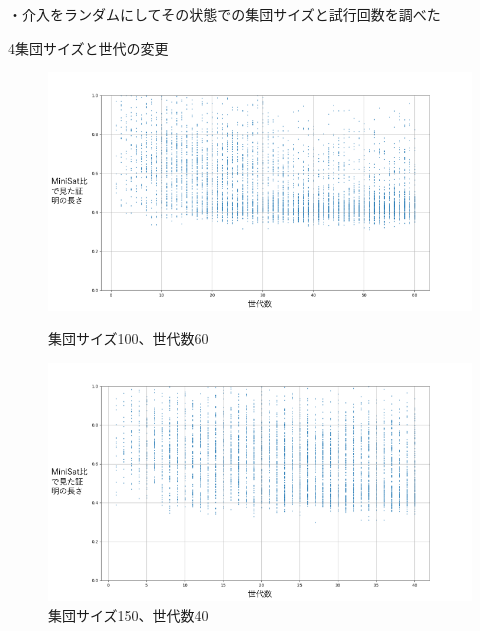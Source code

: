 ・介入をランダムにしてその状態での集団サイズと試行回数を調べた

4集団サイズと世代の変更

\begin{figure}[h]
    \centering
    \begin{minipage}{0.43\columnwidth}
        \centering
        \includegraphics[width=\columnwidth]{figures/Experiment1/4-1.png}
        \caption{集団サイズ100、世代数60}
        \label{fig:サンプルA}
    \end{minipage}
    \hspace{5mm}
    \begin{minipage}{0.43\columnwidth}
        \centering
        \includegraphics[width=\columnwidth]{figures/Experiment1/4-2.png}
        \caption{集団サイズ150、世代数40}
        \label{fig:サンプルB}
    \end{minipage}
  
    \vspace{3mm}
    

\end{figure}
